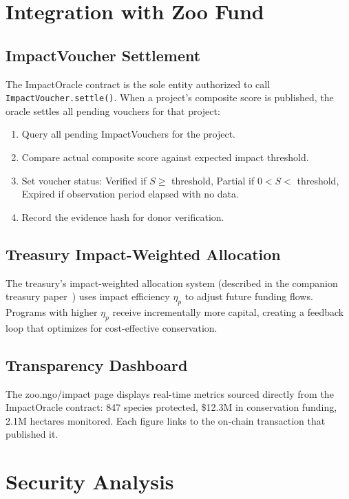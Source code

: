 \documentclass[11pt,letterpaper]{article}
\begin{document}
\section{Integration with Zoo Fund}

\subsection{ImpactVoucher Settlement}

The ImpactOracle contract is the sole entity authorized to call \texttt{ImpactVoucher.settle()}. When a project's composite score is published, the oracle settles all pending vouchers for that project:

\begin{enumerate}
    \item Query all pending ImpactVouchers for the project.
    \item Compare actual composite score against expected impact threshold.
    \item Set voucher status: Verified if $S \geq$ threshold, Partial if $0 < S <$ threshold, Expired if observation period elapsed with no data.
    \item Record the evidence hash for donor verification.
\end{enumerate}

\subsection{Treasury Impact-Weighted Allocation}

The treasury's impact-weighted allocation system (described in the companion treasury paper~\cite{zoofundtreasury2025}) uses impact efficiency $\eta_p$ to adjust future funding flows. Programs with higher $\eta_p$ receive incrementally more capital, creating a feedback loop that optimizes for cost-effective conservation.

\subsection{Transparency Dashboard}

The zoo.ngo/impact page displays real-time metrics sourced directly from the ImpactOracle contract: 847 species protected, \$12.3M in conservation funding, 2.1M hectares monitored. Each figure links to the on-chain transaction that published it.

\section{Security Analysis}
\end{document}
